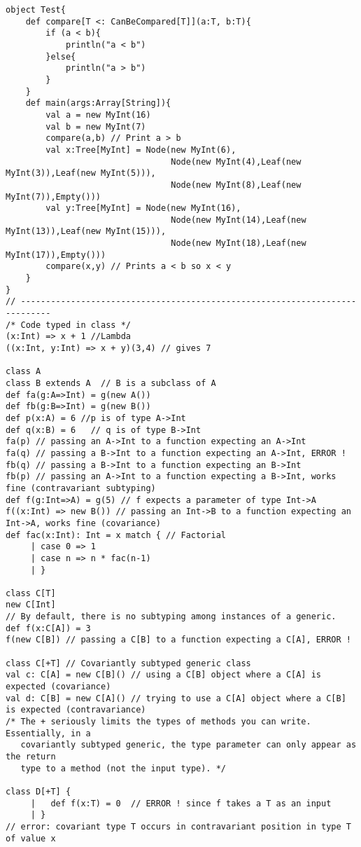 \documentclass[10pt]{article}
\begin{document}
\begin{verbatim}
object Test{
    def compare[T <: CanBeCompared[T]](a:T, b:T){
        if (a < b){
            println("a < b")
        }else{
            println("a > b")
        }
    }
    def main(args:Array[String]){
        val a = new MyInt(16)
        val b = new MyInt(7)
        compare(a,b) // Print a > b
        val x:Tree[MyInt] = Node(new MyInt(6), 
                                 Node(new MyInt(4),Leaf(new MyInt(3)),Leaf(new MyInt(5))), 
                                 Node(new MyInt(8),Leaf(new MyInt(7)),Empty()))
        val y:Tree[MyInt] = Node(new MyInt(16),
                                 Node(new MyInt(14),Leaf(new MyInt(13)),Leaf(new MyInt(15))),
                                 Node(new MyInt(18),Leaf(new MyInt(17)),Empty()))
        compare(x,y) // Prints a < b so x < y
    }
}
// ----------------------------------------------------------------------------
/* Code typed in class */
(x:Int) => x + 1 //Lambda
((x:Int, y:Int) => x + y)(3,4) // gives 7

class A
class B extends A  // B is a subclass of A
def fa(g:A=>Int) = g(new A())
def fb(g:B=>Int) = g(new B())
def p(x:A) = 6 //p is of type A->Int
def q(x:B) = 6   // q is of type B->Int
fa(p) // passing an A->Int to a function expecting an A->Int
fa(q) // passing a B->Int to a function expecting an A->Int, ERROR !
fb(q) // passing a B->Int to a function expecting an B->Int
fb(p) // passing an A->Int to a function expecting a B->Int, works fine (contravariant subtyping)
def f(g:Int=>A) = g(5) // f expects a parameter of type Int->A
f((x:Int) => new B()) // passing an Int->B to a function expecting an Int->A, works fine (covariance)
def fac(x:Int): Int = x match { // Factorial
     | case 0 => 1
     | case n => n * fac(n-1)
     | }

class C[T]
new C[Int]
// By default, there is no subtyping among instances of a generic.
def f(x:C[A]) = 3
f(new C[B]) // passing a C[B] to a function expecting a C[A], ERROR !

class C[+T] // Covariantly subtyped generic class
val c: C[A] = new C[B]() // using a C[B] object where a C[A] is expected (covariance)
val d: C[B] = new C[A]() // trying to use a C[A] object where a C[B] is expected (contravariance)
/* The + seriously limits the types of methods you can write.  Essentially, in a
   covariantly subtyped generic, the type parameter can only appear as the return
   type to a method (not the input type). */

class D[+T] {       
     |   def f(x:T) = 0  // ERROR ! since f takes a T as an input
     | }
// error: covariant type T occurs in contravariant position in type T of value x


\end{verbatim}
\end{document}
